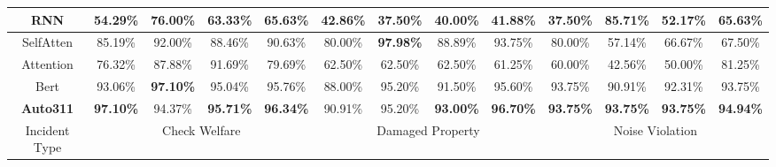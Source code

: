 \begin{table}[]
\begin{tabular}{||c|cccc|cccc|cccc||}
RNN           & \multicolumn{1}{c|}{54.29\%}           & \multicolumn{1}{c|}{76.00\%}           & \multicolumn{1}{c|}{63.33\%}          & 65.63\%          & \multicolumn{1}{c|}{42.86\%}           & \multicolumn{1}{c|}{37.50\%}           & \multicolumn{1}{c|}{40.00\%}          & 41.88\%          & \multicolumn{1}{c|}{37.50\%}           & \multicolumn{1}{c|}{85.71\%}           & \multicolumn{1}{c|}{52.17\%}          & 65.63\%          \\ \hline
SelfAtten     & \multicolumn{1}{c|}{85.19\%}           & \multicolumn{1}{c|}{92.00\%}           & \multicolumn{1}{c|}{88.46\%}          & 90.63\%          & \multicolumn{1}{c|}{80.00\%}           & \multicolumn{1}{c|}{\textbf{97.98\%}} & \multicolumn{1}{c|}{88.89\%}          & 93.75\%          & \multicolumn{1}{c|}{80.00\%}           & \multicolumn{1}{c|}{57.14\%}           & \multicolumn{1}{c|}{66.67\%}          & 67.50\%          \\ \hline
Attention     & \multicolumn{1}{c|}{76.32\%}           & \multicolumn{1}{c|}{87.88\%}           & \multicolumn{1}{c|}{91.69\%}          & 79.69\%          & \multicolumn{1}{c|}{62.50\%}           & \multicolumn{1}{c|}{62.50\%}           & \multicolumn{1}{c|}{62.50\%}          & 61.25\%          & \multicolumn{1}{c|}{60.00\%}           & \multicolumn{1}{c|}{42.56\%}           & \multicolumn{1}{c|}{50.00\%}          & 81.25\%          \\ \hline
Bert          & \multicolumn{1}{c|}{93.06\%}  & \multicolumn{1}{c|}{\textbf{97.10\%}}           & \multicolumn{1}{c|}{95.04\%} & 95.76\% & \multicolumn{1}{c|}{88.00\%}           & \multicolumn{1}{c|}{95.20\%}           & \multicolumn{1}{c|}{91.50\%} & 95.60\% & \multicolumn{1}{c|}{93.75\%}  & \multicolumn{1}{c|}{90.91\%}           & \multicolumn{1}{c|}{92.31\%} & 93.75\% \\ \hline
\textbf{Auto311}          & \multicolumn{1}{c|}{\textbf{97.10\%}}  & \multicolumn{1}{c|}{94.37\%}           & \multicolumn{1}{c|}{\textbf{95.71\%}} & \textbf{96.34\%} & \multicolumn{1}{c|}{90.91\%}           & \multicolumn{1}{c|}{95.20\%}           & \multicolumn{1}{c|}{\textbf{93.00\%}} & \textbf{96.70\%} & \multicolumn{1}{c|}{\textbf{93.75\%}}  & \multicolumn{1}{c|}{\textbf{93.75\%}}           & \multicolumn{1}{c|}{\textbf{93.75\%}} & \textbf{94.94\%} \\ \hline\hline
Incident Type & \multicolumn{4}{c|}{Check Welfare}                                                                                                         & \multicolumn{4}{c|}{Damaged Property}                                                                                                      & \multicolumn{4}{c||}{Noise Violation}                                                                                                       \\ \hline\hline

\end{tabular}
\end{table}
